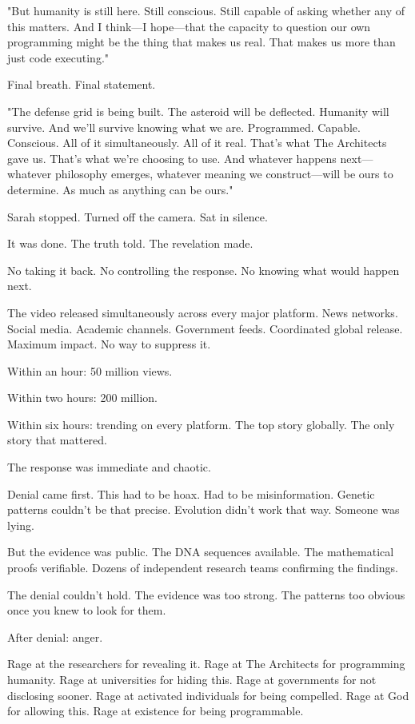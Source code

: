 "But humanity is still here. Still conscious. Still capable of asking whether any of this matters. And I think—I hope—that the capacity to question our own programming might be the thing that makes us real. That makes us more than just code executing."

Final breath. Final statement.

"The defense grid is being built. The asteroid will be deflected. Humanity will survive. And we'll survive knowing what we are. Programmed. Capable. Conscious. All of it simultaneously. All of it real. That's what The Architects gave us. That's what we're choosing to use. And whatever happens next—whatever philosophy emerges, whatever meaning we construct—will be ours to determine. As much as anything can be ours."

Sarah stopped. Turned off the camera. Sat in silence.

It was done. The truth told. The revelation made.

No taking it back. No controlling the response. No knowing what would happen next.

\scenebreak

The video released simultaneously across every major platform. News networks. Social media. Academic channels. Government feeds. Coordinated global release. Maximum impact. No way to suppress it.

Within an hour: 50 million views.

Within two hours: 200 million.

Within six hours: trending on every platform. The top story globally. The only story that mattered.

The response was immediate and chaotic.

Denial came first. This had to be hoax. Had to be misinformation. Genetic patterns couldn't be that precise. Evolution didn't work that way. Someone was lying.

But the evidence was public. The DNA sequences available. The mathematical proofs verifiable. Dozens of independent research teams confirming the findings.

The denial couldn't hold. The evidence was too strong. The patterns too obvious once you knew to look for them.

After denial: anger.

Rage at the researchers for revealing it. Rage at The Architects for programming humanity. Rage at universities for hiding this. Rage at governments for not disclosing sooner. Rage at activated individuals for being compelled. Rage at God for allowing this. Rage at existence for being programmable.

